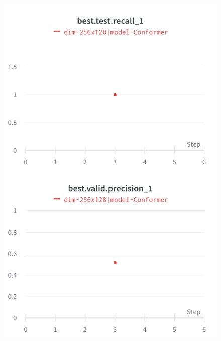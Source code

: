 \documentclass{article}
\begin{document}
\begin{figure}[!htb]
\includegraphics[width=\linewidth]{charts/Section-2-Panel-4-wiygai5sx}
\caption{}
\endminipage\hfill
{}
\includegraphics[width=\linewidth]{charts/Section-2-Panel-5-g8cbhsw70}
\caption{}
\endminipage
\end{figure}
\end{document}
